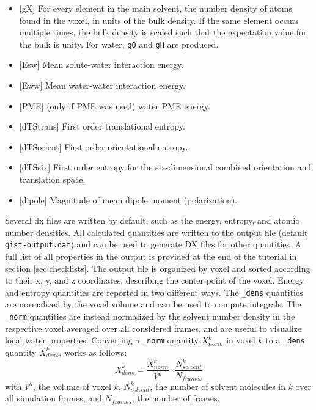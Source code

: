 \documentclass[9pt,tutorial,pubversion]{livecoms}
\newcommand{\code}{\texttt}
\newcommand\inlinecode{\texttt}
\begin{document}
\begin{itemize}
	\item{[gX] For every element in the main solvent, the number density of atoms found in the voxel, in units of the bulk density. 
	If the same element occurs multiple times, the bulk density is scaled such that the expectation value for the bulk is unity. For water, \code{gO} and \code{gH} are produced.}
	\item{[Esw] Mean solute-water interaction energy.}
	\item{[Eww] Mean water-water interaction energy.}
	\item{[PME] (only if PME was used) water PME energy.}
	\item{[dTStrans] First order translational entropy.}
	\item{[dTSorient] First order orientational entropy.}
	\item{[dTSsix] First order entropy for the six-dimensional combined orientation and translation space.}
	\item{[dipole] Magnitude of mean dipole moment (polarization).}
\end{itemize}

Several dx files are written by default, such as the energy, entropy, and atomic number densities.
All calculated quantities are written to the output file (default \inlinecode{gist-output.dat}) and can be used to generate DX files for other quantities.
A full list of all properties in the output is provided at the end of the tutorial in section \ref{sec:checklists}. 
The output file is organized by voxel and sorted according to their x, y, and z coordinates, describing the center point of the voxel.
Energy and entropy quantities are reported in two different ways.
The \inlinecode{\_dens} quantities are normalized by the voxel volume and can be used to compute integrals.
The \inlinecode{\_norm} quantities are instead normalized by the solvent number density in the respective voxel averaged over all considered frames, and are useful to visualize local water properties.
Converting a \inlinecode{\_norm} quantity $X^k_{norm}$ in voxel $k$ to a \inlinecode{\_dens} quantity $X^k_{dens}$, works as follows:
\begin{equation}
	X^k_{dens} = \frac{X^k_{norm}}{V^k} \cdot \frac{N^k_{solvent}}{N_{frames}}
\end{equation}
with $V^k$, the volume of voxel $k$, $N^k_{solvent}$, the number of solvent molecules in $k$ over all simulation frames, and $N_{frames}$, the number of frames.
\end{document}
